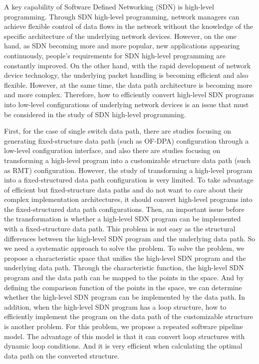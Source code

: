 
\begin{eabstract}

A key capability of Software Defined Networking (SDN) is high-level programming. Through SDN high-level programming, network managers can achieve flexible control of data flows in the network without the knowledge of the specific architecture of the underlying network devices. However, on the one hand, as SDN becoming more and more popular, new applications appearing continuously, people's requirements for SDN high-level programming ​​are constantly improved. On the other hand, with the rapid development of network device technology, the underlying packet handling is becoming efficient and also flexible. However, at the same time, the data path architecture is becoming more and more complex. Therefore, how to efficiently convert high-level SDN programs into low-level configurations of underlying network devices is an issue that must be considered in the study of SDN high-level programming.



First, for the case of single switch data path, there are studies focusing on generating fixed-structure data path (such as OF-DPA) configuration through a low-level configuration interface, and also there are studies focusing on transforming a high-level program into a customizable structure data path (such as RMT) configuration. However, the study of transforming a high-level program into a fixed-structured data path configuration is very limited. To take advantage of efficient but fixed-structure data paths and do not want to care about their complex implementation architectures, it should convert high-level programs into the fixed-structured data path configurations. Then, an important issue before the transformation is whether a high-level SDN program can be implemented with a fixed-structure data path. This problem is not easy as the structural differences between the high-level SDN program and the underlying data path. So we need a systematic approach to solve the problem. To solve the problem, we propose a characteristic space that unifies the high-level SDN program and the underlying data path. Through the characteristic function, the high-level SDN program and the data path can be mapped to the points in the space. And by defining the comparison function of the points in the space, we can determine whether the high-level SDN program can be implemented by the data path. In addition, when the high-level SDN program has a loop structure, how to efficiently implement the program on the data path of the customizable structure is another problem. For this problem, we propose a repeated software pipeline model. The advantage of this model is that it can convert loop structures with dynamic loop conditions. And it is very efficient when calculating the optimal data path on the converted structure.





\end{eabstract}
